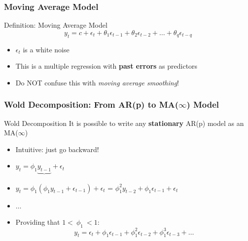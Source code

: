 \documentclass{beamer}
\begin{document}
\begin{frame}
  \frametitle{Moving Average Model}
  \begin{block}{Definition: Moving Average Model}
    \begin{equation*}
      y_t = c + \epsilon_t + \theta_1 \epsilon_{t-1} + \theta_2 \epsilon_{t-2} + \dots + \theta_q \epsilon_{t-q}
    \end{equation*}
    \begin{itemize}
    \item $\epsilon_t$ is a white noise
    \item This is a multiple regression with \textbf{past errors} as predictors
    \item Do NOT confuse this with \emph{moving average smoothing}!
    \end{itemize}    
  \end{block}

\end{frame}



\begin{frame}
  \frametitle{Wold Decomposition: From AR(p) to MA($\infty$) Model}

  \begin{block}{Wold Decomposition}
    It is possible to write any \textbf{stationary} AR(p) model as an MA($\infty$)
  \end{block}

  \begin{itemize}
  \item Intuitive: just go backward!
  \item $y_t = \phi_1 \underbrace{y_{t-1}}_{} + \epsilon_t$
  \item $y_t = \phi_1 (\phi_1 y_{t-1} + \epsilon_{t-1}) + \epsilon_t$ = $\phi_1^2 y_{t-2} + \phi_1\epsilon_{t-1} + \epsilon_t$
  \item $\dots$
  \item Providing that $1 < \ \phi_1 \ < 1$:
    \begin{equation*}
      y_t = \epsilon_t + \phi_1 \epsilon_{t-1} + \phi_1^2 \epsilon_{t-2} + \phi_1^3 \epsilon_{t-3} + \dots
    \end{equation*}
  \end{itemize}  
\end{frame}
\end{document}
